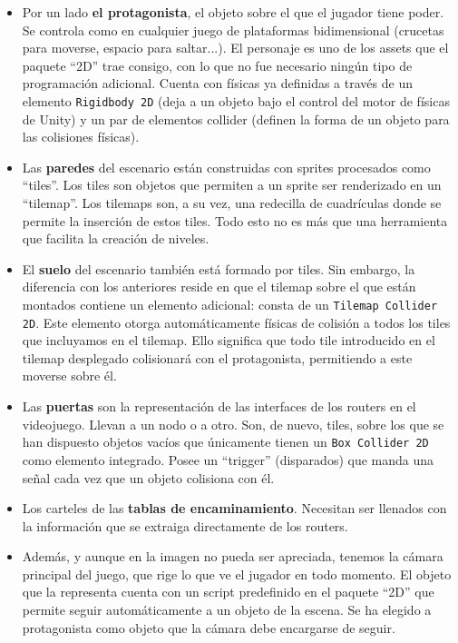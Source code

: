 \begin{itemize}
\item Por un lado \textbf{el protagonista}, el objeto sobre el que el jugador tiene poder. Se controla como en cualquier juego de plataformas bidimensional (crucetas para moverse, espacio para saltar...). El personaje es uno de los assets que el paquete ``2D'' trae consigo, con lo que no fue necesario ningún tipo de programación adicional. Cuenta con físicas ya definidas a través de un elemento \texttt{Rigidbody 2D} (deja a un objeto bajo el control del motor de físicas de Unity\cite{rigidbody}) y un par de elementos collider (definen la forma de un objeto para las colisiones físicas\cite{colliders}).
\item Las \textbf{paredes} del escenario están construidas con sprites procesados como ``tiles''. Los tiles son objetos que permiten a un sprite ser renderizado en un ``tilemap''\cite{tiles}. Los tilemaps son, a su vez, una redecilla de cuadrículas donde se permite la inserción de estos tiles. Todo esto no es más que una herramienta que facilita la creación de niveles. 
\item El \textbf{suelo} del escenario también está formado por tiles. Sin embargo, la diferencia con los anteriores reside en que el tilemap sobre el que están montados contiene un elemento adicional: consta de un \texttt{Tilemap Collider 2D}. Este elemento otorga automáticamente físicas de colisión a todos los tiles que incluyamos en el tilemap. Ello significa que todo tile introducido en el tilemap desplegado colisionará con el protagonista, permitiendo a este moverse sobre él.
\item Las \textbf{puertas} son la representación de las interfaces de los routers en el videojuego. Llevan a un nodo o a otro. Son, de nuevo, tiles, sobre los que se han dispuesto objetos vacíos que únicamente tienen un \texttt{Box Collider 2D} como elemento integrado. Posee un ``trigger'' (disparados) que manda una señal cada vez que un objeto colisiona con él.
\item Los carteles de las \textbf{tablas de encaminamiento}. Necesitan ser llenados con la información que se extraiga directamente de los routers.
\item Además, y aunque en la imagen no pueda ser apreciada, tenemos la cámara principal del juego, que rige lo que ve el jugador en todo momento. El objeto que la representa cuenta con un script predefinido en el paquete ``2D'' que permite seguir automáticamente a un objeto de la escena. Se ha elegido a protagonista como objeto que la cámara debe encargarse de seguir.
\end{itemize}

